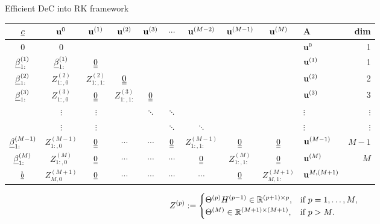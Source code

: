 \documentclass[9pt,compress,t,aspectratio=169]{beamer}
\begin{document}
\begin{frame}{Efficient DeC into RK framework}
{{			\begin{tabular}{|c||cccccccc|l||r|}
				\hline
				$\underline{c}$& $\mathbf{u}^0$ & $\mathbf{u}^{(1)}$& $\mathbf{u}^{(2)}$&$\mathbf{u}^{(3)}$& $\cdots$& $\mathbf{u}^{(M-2)}$& $\mathbf{u}^{(M-1)}$& $\mathbf{u}^{(M)}$&A&dim\\
				\hline
				$0$ & 0 & &&&&&&&$\mathbf{u}^0$&1\\
				$\underline{\beta}^{(1)}_{1:}$& $\underline{\beta}^{(1)}_{1:}$ & $\underline{\underline{0}}$ &&&&&&&$\mathbf{u}^{(1)}$&1 \\
				$\underline{\beta}^{(2)}_{1:}$& $Z^{(2)}_{1:,0}$ & $Z^{(2)}_{1:,1:}$ & $\underline{\underline{0}}$&&&&&&$\mathbf{u}^{(2)}$&2\\
				$\underline{\beta}^{(3)}_{1:}$& $Z^{(3)}_{1:,0}$&  $\underline{\underline{0}}$& $Z^{(3)}_{1:,1:}$ & $\underline{\underline{0}}$&&&&&$\mathbf{u}^{(3)}$&3\\
				&$\vdots$   &$\vdots$ &&$\ddots$& $\ddots$&&&& $\vdots$&$\vdots$\\
				&$\vdots$   &$\vdots$ &&&$\ddots$& $\ddots$&&& $\vdots$&$\vdots$\\
				$\underline{\beta}^{(M-1)}_{1:}$ &$Z^{(M-1)}_{1:,0}$ &  $\underline{\underline{0}}$&$\cdots$&$\cdots$&$\underline{\underline{0}}$ &$Z^{(M-1)}_{1:,1:}$&$\underline{\underline{0}}$&$\underline{\underline{0}}$&$\mathbf{u}^{(M-1)}$&$M-1$\\
				$\underline{\beta}^{(M)}_{1:}$&$Z^{(M)}_{1:,0}$ &   $\underline{\underline{0}}$&$\cdots$&$\cdots$&$\cdots$&$\underline{\underline{0}}$&$Z^{(M)}_{1:,1:}$&$\underline{\underline{0}}$&$\mathbf{u}^{(M)}$&$M$\\ \hline\hline
				$\underline{b}$&$Z^{(M+1)}_{M,0}$ &  $\underline{0}$&$\cdots$&$\cdots$&$\cdots$&$\cdots$&$\underline{0}$&$Z^{(M+1)}_{M,1:}$&$\mathbf{u}^{M,(M+1)}$&\\ \hline
		\end{tabular} } 
	\begin{align*}
		Z^{(p)} : = \begin{cases}
			\Theta^{(p)}H^{(p-1)} \in \mathbb{R}^{(p+1)\times p}, &\text{if } p =1, \dots, M,\\
			\Theta^{(M)} \in \mathbb{R}^{(M+1)\times (M+1)}, & \text{if } p >M.
		\end{cases}
	\end{align*}
	}
	\end{frame}
	
\end{document}
